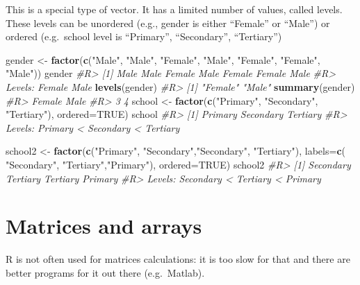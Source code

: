 \documentclass[]{book}
\newenvironment{Shaded}{}{}
\newcommand{\CommentTok}[1]{\textcolor[rgb]{0.38,0.63,0.69}{\textit{#1}}}
\newcommand{\DataTypeTok}[1]{\textcolor[rgb]{0.56,0.13,0.00}{#1}}
\newcommand{\KeywordTok}[1]{\textcolor[rgb]{0.00,0.44,0.13}{\textbf{#1}}}
\newcommand{\NormalTok}[1]{#1}
\newcommand{\OtherTok}[1]{\textcolor[rgb]{0.00,0.44,0.13}{#1}}
\newcommand{\StringTok}[1]{\textcolor[rgb]{0.25,0.44,0.63}{#1}}
\theoremstyle{definition}
\theoremstyle{definition}
\theoremstyle{definition}
\theoremstyle{remark}
\begin{document}
This is a special type of vector. It has a limited number of values,
called levels. These levels can be unordered (e.g., gender is either
``Female'' or ``Male'') or ordered (e.g.~school level is ``Primary'',
``Secondary'', ``Tertiary'')

\begin{Shaded}
\begin{Highlighting}[]
\NormalTok{gender <-}\StringTok{ }\KeywordTok{factor}\NormalTok{(}\KeywordTok{c}\NormalTok{(}\StringTok{"Male"}\NormalTok{, }\StringTok{"Male"}\NormalTok{, }\StringTok{"Female"}\NormalTok{, }\StringTok{"Male"}\NormalTok{, }\StringTok{"Female"}\NormalTok{, }\StringTok{"Female"}\NormalTok{, }\StringTok{"Male"}\NormalTok{))}
\NormalTok{gender}
\CommentTok{#R> [1] Male   Male   Female Male   Female Female Male  }
\CommentTok{#R> Levels: Female Male}
\KeywordTok{levels}\NormalTok{(gender)}
\CommentTok{#R> [1] "Female" "Male"}
\KeywordTok{summary}\NormalTok{(gender)}
\CommentTok{#R> Female   Male }
\CommentTok{#R>      3      4}
\NormalTok{school <-}\StringTok{ }\KeywordTok{factor}\NormalTok{(}\KeywordTok{c}\NormalTok{(}\StringTok{"Primary"}\NormalTok{, }\StringTok{"Secondary"}\NormalTok{, }\StringTok{"Tertiary"}\NormalTok{),}
                    \DataTypeTok{ordered=}\OtherTok{TRUE}\NormalTok{)}
\NormalTok{school}
\CommentTok{#R> [1] Primary   Secondary Tertiary }
\CommentTok{#R> Levels: Primary < Secondary < Tertiary}

\NormalTok{school2 <-}\StringTok{ }\KeywordTok{factor}\NormalTok{(}\KeywordTok{c}\NormalTok{(}\StringTok{"Primary"}\NormalTok{, }\StringTok{"Secondary"}\NormalTok{,}\StringTok{"Secondary"}\NormalTok{, }\StringTok{"Tertiary"}\NormalTok{),}
                    \DataTypeTok{labels=}\KeywordTok{c}\NormalTok{( }\StringTok{"Secondary"}\NormalTok{, }\StringTok{"Tertiary"}\NormalTok{,}\StringTok{"Primary"}\NormalTok{),}
                    \DataTypeTok{ordered=}\OtherTok{TRUE}\NormalTok{)}
\NormalTok{school2}
\CommentTok{#R> [1] Secondary Tertiary  Tertiary  Primary  }
\CommentTok{#R> Levels: Secondary < Tertiary < Primary}
\end{Highlighting}
\end{Shaded}

\hypertarget{matrices-and-arrays}{%
\section{Matrices and arrays}\label{matrices-and-arrays}}

R is not often used for matrices calculations: it is too slow for that
and there are better programs for it out there (e.g.~Matlab).
\end{document}
